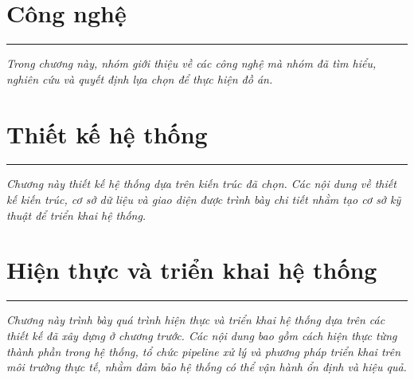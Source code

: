 \documentclass[a4paper]{article}
\theoremstyle{definition}
\begin{document}
\section{Công nghệ}
\hrule
\begin{center}
  \begin{minipage}{0.75\textwidth}
    \begin{center}
      \itshape
      Trong chương này, nhóm giới thiệu về các công nghệ mà nhóm đã tìm hiểu, nghiên cứu và quyết định lựa chọn để thực hiện đồ án.
    \end{center}
  \end{minipage}
\end{center}




\clearpage





\section{Thiết kế hệ thống}
\hrule
\begin{center}
  \begin{minipage}{0.75\textwidth}
    \begin{center}
      \itshape
      Chương này thiết kế hệ thống dựa trên kiến trúc đã chọn. Các nội dung về thiết kế kiến trúc, cơ sở dữ liệu và giao diện được trình bày chi tiết nhằm tạo cơ sở kỹ thuật để triển khai hệ thống.
    \end{center}
  \end{minipage}
\end{center}







\clearpage





\section{Hiện thực và triển khai hệ thống}
\hrule
\begin{center}
  \begin{minipage}{0.75\textwidth}
    \begin{center}
      \itshape
      Chương này trình bày quá trình hiện thực và triển khai hệ thống dựa trên các thiết kế đã xây dựng ở chương trước. Các nội dung bao gồm cách hiện thực từng thành phần trong hệ thống, tổ chức pipeline xử lý và phương pháp triển khai trên môi trường thực tế, nhằm đảm bảo hệ thống có thể vận hành ổn định và hiệu quả.
    \end{center}
  \end{minipage}
\end{center}


\clearpage
\end{document}
